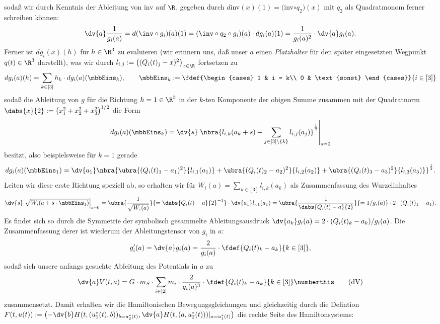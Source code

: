 \documentclass{subfiles}
\begin{document}
    sodaß wir durch Kenntnis der Ableitung von inv auf $\R$, gegeben durch $d$inv$(x)(1) = ($inv$\circ q_2)(x)$ mit $q_2$ als Quadratmonom ferner schreiben können:
    \[
        \dv{a}\frac{1}{g_i(a)} = d(\inv\circ g_i)(a)(1) = (\inv\circ q_2\circ g_i)(a)\cdot dg_i(a)(1) = \frac{1}{g_i(a)^2}\cdot \dv{a}g_i(a).  
    \]
    Ferner ist $dg_i(x)(h)$ für $h\in\R^3$ zu evaluieren (wir erinnern uns, daß unser $a$ einen \emph{Platzhalter} für den später eingesetzten Wegpunkt $q(t)\in\R^3$ darstellt), was wir durch $l_{i,j}:=\bigl((Q_i(t)_j - x)^2\bigr)_{x\in\R}$ fortsetzen zu
    \[
        dg_i(a)(h) = \sum_{k\in[3]}h_k\cdot dg_i(a)(\mbbEins_k), \qquad\mbbEins_{k}:=\fdef{\begin{cases}
            1 & i = k\\
            0 & \text{sonst}
        \end{cases}}{i\in[3]}
    \]
    sodaß die Ableitung von $g$ für die Richtung $h=1\in\R^3$ in der $k$-ten Komponente der obigen Summe zusammen mit der Quadratnorm $\dabs{x}{2} := \bigl(x_1^2 + x_2^2 + x_3^2\bigr)^{1/2}$ die Form 
    \[
        dg_i(a)(\mbbEins_k) = \dv{s}\left.\nbra{l_{i,k}(a_k + s) + \sum_{j\in[3]\setminus{\{k\}}}l_{i,j}(a_j)}^{\frac12}\right|_{s=0}
    \]
    besitzt, also beispielsweise für $k=1$ gerade
    \[
        dg_i(a)(\mbbEins_1) = \dv{a_1}\nbra{\ubra{(Q_i(t)_1 - a_1)^2}{l_{i,1}(a_1)} + \ubra{(Q_i(t)_2 - a_2)^2}{l_{i,2}(a_2)} + \ubra{(Q_i(t)_3 - a_3)^2}{l_{i,3}(a_3)}}^{\frac12}.
    \]
    Leiten wir diese erste Richtung speziell ab, so erhalten wir für $W_i(a) = \sum_{k\in[3]}l_{i,k}(a_k)$ als Zusammenfassung des Wurzelinhaltes
    \[
        \dv{s}\left.\sqrt{W_i(a + s\cdot\mbbEins_1)}\right|_{s=0} = \ubra{\frac{1}{\sqrt{W_i(a)}}}{=\dabs{Q_i(t) - a}{2}^{-1}}\cdot\dv{a_1}l_{i,1}(a_1) = \ubra{\frac{1}{\dabs{Q_i(t) - a}{2}}}{= 1/g_i(a)}\cdot 2\cdot (Q_i(t)_1 - a_1). 
    \]
    Es findet sich so durch die Symmetrie der symbolisch gesammelte Ableitungsausdruck $\dv{a_k}g_i(a) = 2\cdot (Q_i(t)_k - a_k) / g_i(a)$. Die Zusammenfassung derer ist wiederum der Ableitungstensor von $g_i$ in $a$:
    \[
        g_i'(a) = \dv{a}g_i(a) = \frac{2}{g_i(a)}\cdot\fdef{Q_i(t)_k - a_k}{k\in[3]},
    \]
    sodaß sich unsere anfangs gesuchte Ableitung des Potentials in $a$ zu 
    \[
        \dv{a}V(t,a) = G\cdot m_S\cdot\sum_{i\in[2]}m_i\cdot\frac{2}{g_i(a)^3}\cdot\fdef{Q_i(t)_k - a_k}{k\in[3]}\numberthis\label{eq:dV}\tag{dV}
    \]
    zusammensetzt. Damit erhalten wir die Hamiltonischen Bewegungsgleichungen und gleichzeitig durch die Defintion $F(t,u(t)):=\bigl(-\dv{b}H(t,(u_1^*(t),b))_{b=u_2^*(t)},\dv{a}H(t,(a,u_2^*(t)))|_{a=u_1^*(t)}\bigr)$ die rechte Seite des Hamiltonsystems:
\end{document}

